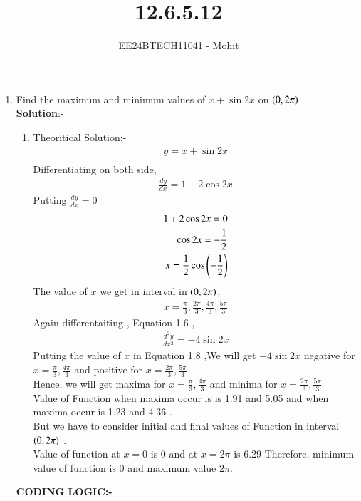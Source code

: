\documentclass[journal]{IEEEtran}
\numberwithin{equation}{enumi}
\numberwithin{figure}{enumi}
\begin{document}

\title{12.6.5.12}
\author{EE24BTECH11041 - Mohit}
{\let\newpage\relax\maketitle}
\begin{enumerate}
\item Find the maximum and minimum values of $x + \sin{2x}$ on $\left( 0,2\pi \right)$\\
\textbf{Solution}:-
\begin{enumerate}
\item Theoritical Solution:-
\begin{align}
y = x + \sin{2x}\\
\end{align}
Differentiating on both side,
\begin{align}
\frac{dy}{dx} = 1 + 2\cos{2x}
\end{align}
Putting $\frac{dy}{dx} =  0$
\begin{align}
1 + 2\cos{2x} = 0\\
\cos{2x} = -\frac{1}{2}\\
x = \frac{1}{2}\cos{\ensuremath{\left(-\frac{1}{2}\right)}}
\end{align}
The value of $x$ we get in interval in $\left(0,2\pi\right)$,
\begin{align}
 x = \frac{\pi}{3},\frac{2\pi}{3},\frac{4\pi}{3},\frac{5\pi}{3}
\end{align}
Again differentaiting , Equation 1.6 ,
\begin{align}
\frac{d^2y}{dx^2} = -4\sin{2x}
\end{align} 
Putting the value of $x$ in Equation 1.8 ,We will get $-4\sin{2x}$ negative for $x= \frac{\pi}{3},\frac{4\pi}{3}$ and positive for $x = \frac{2\pi}{3},\frac{5\pi}
{3}$\\
Hence, we will get maxima for $x= \frac{\pi}{3},\frac{4\pi}{3}$ and minima for $x = \frac{2\pi}{3},\frac{5\pi}{3}$\\
Value of Function when maxima occur is is 1.91 and 5.05 and when maxima occur is 1.23 and 4.36 . \\
But we have to consider initial and final values of Function in interval $\left(0,2\pi\right)$ .\\
Value of function at $x=0$ is 0 and at $x=2\pi$ is 6.29
Therefore, minimum value of function is 0 and maximum value $2\pi$.
\end{enumerate}
\textbf{CODING LOGIC:-}


\end{enumerate}
\end{document}
